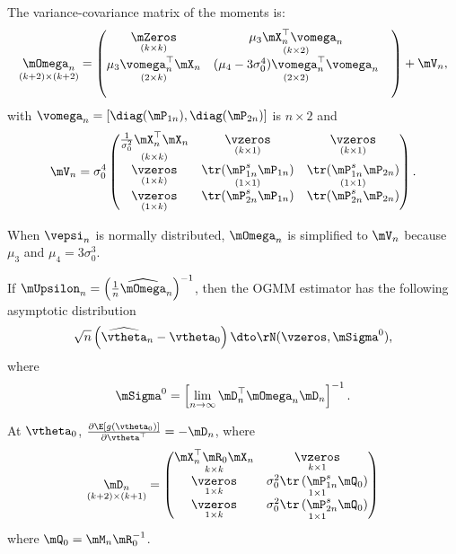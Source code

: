 \documentclass[english,12pt]{book}\usepackage[]{graphicx}\usepackage[]{xcolor}
\begin{document}
The variance-covariance matrix of the moments is:
\begin{equation*}
\underset{(k + 2) \times (k+2)}{\mOmega_n} = \begin{pmatrix}
\underset{(k \times k)}{\mZeros} & \underset{(k \times 2)}{\mu_3 \mX_n^\top\vomega_n} \\
              \underset{(2 \times k)}{\mu_3\vomega^\top_n\mX_n}  & \underset{(2 \times 2)}{(\mu_4 - 3\sigma_0^4)\vomega_n^\top\vomega_n} & \\
               & 
            \end{pmatrix}
             + 
             \mV_n,
\end{equation*}
%
with $\vomega_n = \left[\diag(\mP_{1n}), \diag(\mP_{2n})\right]$ is $n\times 2$ and 
\begin{equation*}
  \mV_n = \sigma_0^4
          \begin{pmatrix}
          \underset{(k\times k)}{\frac{1}{\sigma_0^2}\mX_n^\top\mX_n} & \underset{(k\times 1)}{\vzeros} & \underset{(k\times 1)}{\vzeros} \\
          \underset{(1\times k)}{\vzeros}
          & \underset{(1\times 1)}{\tr(\mP_{1n}^s\mP_{1n})} & \underset{(1\times 1)}{\tr(\mP_{1n}^s\mP_{2n})}  \\
          \underset{(1\times k)}{\vzeros} &
          \tr(\mP_{2n}^s\mP_{1n}) & \tr(\mP_{2n}^s\mP_{2n})
          \end{pmatrix}.
\end{equation*}

When $\vepsi_n$ is normally distributed, $\mOmega_n$ is simplified to $\mV_n$ because $\mu_3$ and $\mu_4 = 3\sigma_0^3$.

If $\mUpsilon_n = \left(\frac{1}{n}\widehat{\mOmega}_n\right)^{-1}$, then the OGMM estimator has the following asymptotic distribution
\begin{equation*}
\sqrt{n}\left(\widehat{\vtheta}_n - \vtheta_0\right)\dto \rN(\vzeros, \mSigma^0),
\end{equation*}
%
where
\begin{equation*}
\mSigma^0 = \left[\lim_{n\to\infty}\mD_n^\top\mOmega_n\mD_n\right]^{-1}.
\end{equation*}

At $\vtheta_0$, $\frac{\partial \E\left[g(\vtheta_0)\right]}{\partial \vtheta^\top} = - \mD_n$, where
\begin{equation}\label{eq:D-gmm-sem}
\underset{(k + 2)\times (k + 1)}{\mD_n} = 
\begin{pmatrix}
  \underset{k\times k}{\mX_n^\top\mR_0\mX_n} & \underset{k\times 1}{\vzeros} \\
  \underset{1 \times k}{\vzeros} & \underset{1\times 1}{\sigma_0^2 \tr\left(\mP_{1n}^{s}\mQ_0\right)}\\
  \underset{1\times k}{\vzeros} & \underset{1\times 1}{\sigma_0^2 \tr\left(\mP_{2n}^{s}\mQ_0\right)}
\end{pmatrix}
\end{equation}
%
where $\mQ_0 = \mM_n\mR_0^{-1}$. 
\end{document}
